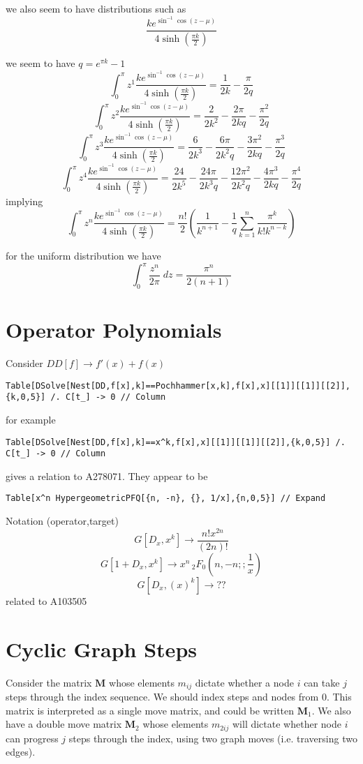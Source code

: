 \documentclass{article}
\begin{document}
we also seem to have distributions such as 
$$
\frac{k e^{\sin^{-1} \cos(z-\mu)}}{4 \sinh(\frac{\pi k}{2})}
$$

we seem to have $q = e^{\pi k}-1$
$$
\int_0^\pi z^1 \frac{k e^{\sin^{-1} \cos(z-\mu)}}{4 \sinh(\frac{\pi k}{2})} = \frac{1}{2 k} - \frac{\pi}{2q}
$$
$$
\int_0^\pi z^2 \frac{k e^{\sin^{-1} \cos(z-\mu)}}{4 \sinh(\frac{\pi k}{2})} = \frac{2}{2 k^2} - \frac{2\pi}{2kq} - \frac{\pi^2}{2q}
$$
$$
\int_0^\pi z^3 \frac{k e^{\sin^{-1} \cos(z-\mu)}}{4 \sinh(\frac{\pi k}{2})} = \frac{6}{2 k^3} - \frac{6\pi}{2k^2q} - \frac{3\pi^2}{2kq} - \frac{\pi^3}{2q}
$$
$$
\int_0^\pi z^4 \frac{k e^{\sin^{-1} \cos(z-\mu)}}{4 \sinh(\frac{\pi k}{2})} = \frac{24}{2 k^5} - \frac{24\pi}{2k^3q} - \frac{12\pi^2}{2k^2q} - \frac{4\pi^3}{2kq} - \frac{\pi^4}{2q}
$$
implying
$$
\int_0^\pi z^n \frac{k e^{\sin^{-1} \cos(z-\mu)}}{4 \sinh(\frac{\pi k}{2})} = \frac{n!}{2}\left(\frac{1}{k^{n+1}} - \frac{1}{q}\sum_{k=1}^n \frac{\pi^k}{k! k^{n-k}}\right)
$$

for the uniform distribution we have 
$$
\int_0^\pi \frac{z^n}{2 \pi} \; dz = \frac{\pi^n}{2(n+1)}
$$

\section{Operator Polynomials}
Consider $DD[f] \to f'(x) + f(x)$
\begin{verbatim}
Table[DSolve[Nest[DD,f[x],k]==Pochhammer[x,k],f[x],x][[1]][[1]][[2]],{k,0,5}] /. C[t_] -> 0 // Column
\end{verbatim}
for example 
\begin{verbatim}
Table[DSolve[Nest[DD,f[x],k]==x^k,f[x],x][[1]][[1]][[2]],{k,0,5}] /. C[t_] -> 0 // Column
\end{verbatim}
gives a relation to A278071. They appear to be 
\begin{verbatim}
Table[x^n HypergeometricPFQ[{n, -n}, {}, 1/x],{n,0,5}] // Expand
\end{verbatim}

Notation (operator,target)
$$
G[D_x,x^k] \to \frac{n! x^{2n}}{(2n)!}
$$
$$
G[1+D_x,x^k] \to x^n\,_2F_0(n,-n;;\frac{1}{x})
$$
$$
G[D_x,(x)^k] \to ??
$$
related to A103505


\section{Cyclic Graph Steps}
Consider the matrix $\mathbf{M}$ whose elements $m_{ij}$ dictate whether a node $i$ can take $j$ steps through the index sequence. We should index steps and nodes from $0$. This matrix is interpreted as a single move matrix, and could be written $\mathbf{M}_1$. We also have a double move matrix $\mathbf{M}_2$ whose elements $m_{2ij}$ will dictate whether node $i$ can progress $j$ steps through the index, using two graph moves (i.e. traversing two edges).
\end{document}
